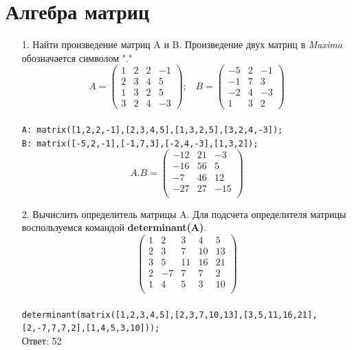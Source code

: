 \documentclass[article, bachelor, och, pract]{SCWorks}
\begin{document}
\section{Алгебра матриц}
\begin{itemize}
\item[1.] Найти произведение матриц A и B. Произведение двух матриц в \emph{Maxima} обозначается символом "."\\
$$
A=\begin{pmatrix}
1 & 2 & 2 & -1\\
2 & 3 & 4 & 5\\
1 & 3 & 2 & 5\\
3 & 2 & 4 & -3
\end{pmatrix}; \; \; \;
B=\begin{pmatrix}
-5 & 2 & -1\\
-1 & 7 & 3\\
-2 & 4 & -3\\
1 & 3 & 2
\end{pmatrix}$$\\
\texttt{A: matrix([1,2,2,-1],[2,3,4,5],[1,3,2,5],[3,2,4,-3]);}\\
\texttt{B: matrix([-5,2,-1],[-1,7,3],[-2,4,-3],[1,3,2]);}
\\
$$A.B = 
\begin{pmatrix}
-12 & 21 & -3\\
-16 & 56 & 5\\
-7 & 46 & 12\\
-27 & 27 & -15 \\
\end{pmatrix}$$
\item[2.] Вычислить определитель матрицы A. Для подсчета определителя матрицы воспользуемся командой \textbf{determinant(A)}.\\
$$\begin{pmatrix}
1 & 2 & 3 & 4 & 5\\
2 & 3 & 7 & 10 & 13\\
3 & 5 & 11 & 16 & 21\\
2 & -7 & 7 & 7 & 2\\
1 & 4 & 5 & 3 & 10 \\
\end{pmatrix}$$\\
\texttt{determinant(matrix([1,2,3,4,5],[2,3,7,10,13],[3,5,11,16,21],}\\
\texttt{[2,-7,7,7,2],[1,4,5,3,10]));}\\
Ответ: 52




\end{itemize}
\end{document}
